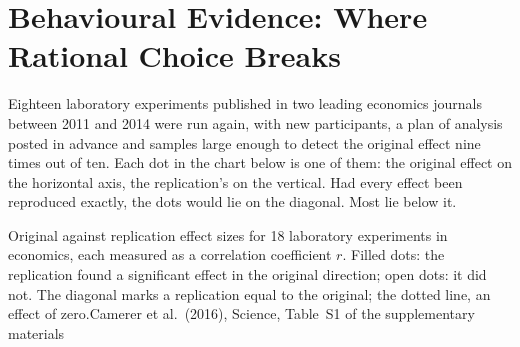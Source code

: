 \chapter{Behavioural Evidence: Where Rational Choice Breaks}\label{ch:b2:behavioural-evidence}

Eighteen laboratory experiments published in two leading economics journals between 2011 and 2014 were
run again, with new participants, a plan of analysis posted in advance and samples large enough to detect
the original effect nine times out of ten. Each dot in the chart below is one of them: the original
effect on the horizontal axis, the replication's on the vertical. Had every effect been reproduced
exactly, the dots would lie on the diagonal. Most lie below it.

\begin{openingchart}{Original against replication effect sizes for 18 laboratory experiments in
  economics, each measured as a correlation coefficient $r$. Filled dots: the replication found a
  significant effect in the original direction; open dots: it did not. The diagonal marks a replication
  equal to the original; the dotted line, an effect of zero.}{Camerer et al.\ (2016), Science,
  Table~S1 of the supplementary materials}
\end{openingchart}

